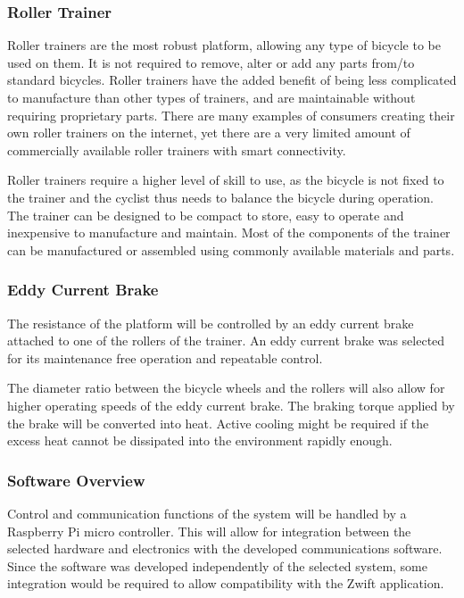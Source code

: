 \subsubsection{Roller Trainer}

Roller trainers are the most robust platform, allowing any type of bicycle to be used on them. It is not required to remove, alter or add any parts from/to standard bicycles. Roller trainers have the added benefit of being less complicated to manufacture than other types of trainers, and are maintainable without requiring proprietary parts. There are many examples of consumers creating their own roller trainers on the internet, yet there are a very limited amount of commercially available roller trainers with smart connectivity.

Roller trainers require a higher level of skill to use, as the bicycle is not fixed to the trainer and the cyclist thus needs to balance the bicycle during operation. The trainer can be designed to be compact to store, easy to operate and inexpensive to manufacture and maintain. Most of the components of the trainer can be manufactured or assembled using commonly available materials and parts.

\subsubsection{Eddy Current Brake}

The resistance of the platform will be controlled by an eddy current brake attached to one of the rollers of the trainer. An eddy current brake was selected for its maintenance free operation and repeatable control.

The diameter ratio between the bicycle wheels and the rollers will also allow for higher operating speeds of the eddy current brake. The braking torque applied by the brake will be converted into heat. Active cooling might be required if the excess heat cannot be dissipated into the environment rapidly enough.

\subsubsection{Software Overview}

Control and communication functions of the system will be handled by a Raspberry Pi micro controller. This will allow for integration between the selected hardware and electronics with the developed communications software. Since the software was developed independently of the selected system, some integration would be required to allow compatibility with the Zwift application.

